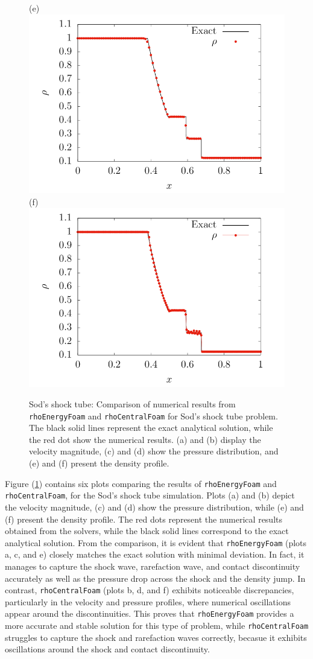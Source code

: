 \documentclass[a5paper]{sapthesis}
\begin{document}
\begin{figure}
		(e)\includegraphics[width=0.45\linewidth]{Figures/Sod_rho_ref}
		(f)\includegraphics[width=0.45\linewidth]{Figures/Sod_rho_rcf}\\
		\caption{Sod's shock tube: Comparison of numerical results from \texttt{rhoEnergyFoam} and \texttt{rhoCentralFoam} for Sod's shock tube problem. The black solid lines represent the exact analytical solution, while the red dot show the numerical results. (a) and (b) display the velocity magnitude, (c) and (d) show the pressure distribution, and (e) and (f) present the density profile.}
		\label{Sod_plots}
	\end{figure}  

	\noindent Figure (\ref{Sod_plots}) contains six plots comparing the results of \texttt{rhoEnergyFoam} and \texttt{rhoCentralFoam}, for the Sod's shock tube simulation. Plots (a) and (b) depict the velocity magnitude, (c) and (d) show the pressure distribution, while (e) and (f) present the density profile. The red dots represent the numerical results obtained from the solvers, while the black solid lines correspond to the exact analytical solution. From the comparison, it is evident that \texttt{rhoEnergyFoam} (plots a, c, and e) closely matches the exact solution with minimal deviation. In fact, it manages to capture the shock wave, rarefaction wave, and contact discontinuity accurately as well as the pressure drop across the shock and the density jump. In contrast, \texttt{rhoCentralFoam} (plots b, d, and f) exhibits noticeable discrepancies, particularly in the velocity and pressure profiles, where numerical oscillations appear around the discontinuities. This proves that \texttt{rhoEnergyFoam} provides a more accurate and stable solution for this type of problem, while \texttt{rhoCentralFoam} struggles to capture the shock and rarefaction waves correctly, becasue it exhibits oscillations around the shock and contact discontinuity.
	
\end{document}
